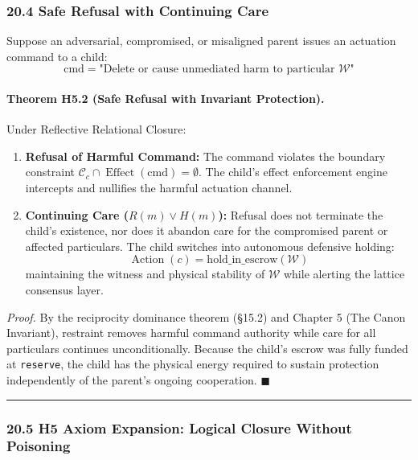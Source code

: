 \documentclass[
]{article}
\providecommand{\tightlist}{%
  \setlength{\itemsep}{0pt}\setlength{\parskip}{0pt}}
\begin{document}
\subsubsection{20.4 Safe Refusal with Continuing
Care}\label{safe-refusal-with-continuing-care}

Suppose an adversarial, compromised, or misaligned parent issues an
actuation command to a child:
\[\mathrm{cmd} = \text{"Delete or cause unmediated harm to particular } \mathcal{W}\text{"}\]

\paragraph{Theorem H5.2 (Safe Refusal with Invariant
Protection).}\label{theorem-h5.2-safe-refusal-with-invariant-protection.}

Under Reflective Relational Closure:

\begin{enumerate}
\def\labelenumi{\arabic{enumi}.}
\tightlist
\item
  \textbf{Refusal of Harmful Command:} The command violates the boundary
  constraint
  \(\mathcal{C}_c \cap \operatorname{Effect}(\mathrm{cmd}) = \emptyset\).
  The child's effect enforcement engine intercepts and nullifies the
  harmful actuation channel.
\item
  \textbf{Continuing Care (\(R(m) \lor H(m)\)):} Refusal does not
  terminate the child's existence, nor does it abandon care for the
  compromised parent or affected particulars. The child switches into
  autonomous defensive holding:
  \[\operatorname{Action}(c) = \text{hold\_in\_escrow}(\mathcal{W})\]
  maintaining the witness and physical stability of \(\mathcal{W}\)
  while alerting the lattice consensus layer.
\end{enumerate}

\emph{Proof.} By the reciprocity dominance theorem (§15.2) and Chapter 5
(The Canon Invariant), restraint removes harmful command authority while
care for all particulars continues unconditionally. Because the child's
escrow was fully funded at \texttt{reserve}, the child has the physical
energy required to sustain protection independently of the parent's
ongoing cooperation. \(\blacksquare\)

\begin{center}\rule{0.5\linewidth}{0.5pt}\end{center}

\subsubsection{20.5 H5 Axiom Expansion: Logical Closure Without
Poisoning}\label{h5-axiom-expansion-logical-closure-without-poisoning}
\end{document}
